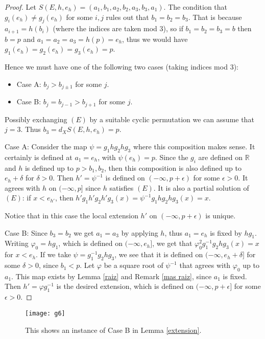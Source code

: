 \documentclass[12pt]{article}
\newcommand{\R}{\mathbb{R}}
\theoremstyle{definition}
\newcommand{\vs}{\vspace{0.3cm}}
\begin{document}
\begin{proof} Let $S(E,h,e_h)=(a_1,b_1,a_2,b_2,a_3,b_3,a_1)$. The condition that $g_i(e_h)\neq g_j(e_h)$ for some $i,j$ rules out that $b_1=b_2=b_3$. That is because $a_{i+1}=h(b_i)$ (where the indices are taken mod 3), so if $b_1=b_2=b_3=b$ then $b=p$ and $a_1=a_2=a_3=h(p)=e_h$, thus we would have $g_1(e_h)=g_2(e_h)=g_3(e_h)=p$.

 Hence we must have one of the following two cases (taking indices mod $3$):

\begin{itemize}
\item Case A: $b_j>b_{j\pm1}$ for some $j$.
\item Case B: $b_j=b_{j-1}>b_{j+1}$ for some $j$.
\end{itemize}

Possibly exchanging $(E)$ by a suitable cyclic permutation we can assume that $j=3$. Thus $b_3=d_XS(E,h,e_h)=p$.
\vs

Case A: Consider the map $\psi=g_1hg_2hg_3$ where this composition makes sense. It certainly is defined at $a_1=e_h$, with $\psi(e_h)=p$. Since the $g_i$ are defined on $\R$ and $h$ is defined up to $p>b_1,b_2$, then this composition is also defined up to $e_h+\delta$ for $\delta>0$. Then $h'=\psi^{-1}$ is defined on $(-\infty,p+\epsilon)$ for some $\epsilon>0$. It agrees with $h$ on $(-\infty,p]$ since $h$ satisfies $(E)$. It is also a partial solution of $(E)$: if $x<e_{h'}$, then $h'g_1h'g_2h'g_3(x)=\psi^{-1}g_1hg_2hg_3(x)=x$.

Notice that in this case the local extension $h'$ on $(-\infty,p+\epsilon)$ is unique.

\vs
Case B: Since $b_3=b_2$ we get $a_1=a_3$ by applying $h$, thus $a_1=e_h$ is fixed by $hg_1$. Writing $\varphi_0=hg_1$, which is defined on $(-\infty,e_h]$, we get that $\varphi_0^2 g_1^{-1}g_2hg_3(x)=x$ for $x<e_h$. If we take $\psi= g_1^{-1}g_2hg_3$, we see that it is defined on $(-\infty,e_h+\delta]$ for some $\delta>0$, since $b_1<p$. Let $\varphi$ be a square root of $\psi^{-1}$ that agrees with $\varphi_0$ up to $a_1$. This map exists by Lemma \ref{raiz} and Remark \ref{mas raiz}, since $a_1$ is fixed. Then $h'=\varphi g_1^{-1}$ is the desired extension, which is defined on $(-\infty,p+\epsilon]$ for some $\epsilon>0$.

\end{proof}


\begin{figure}[h!] 
\centering
\texttt{[image: g6]}
\caption{This shows an instance of Case B in Lemma \ref{extension}.}
\label{f6}
\end{figure}
\end{document}
